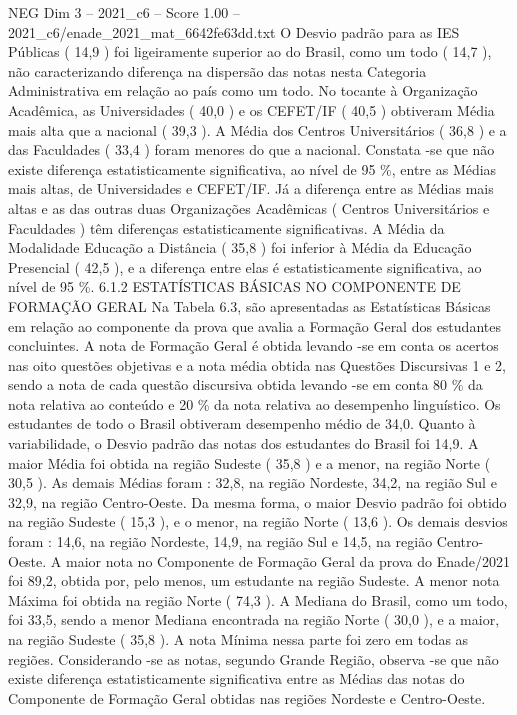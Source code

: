 \begin{textsample}{NEG Dim 3 – 2021\_c6 – Score 1.00 – 2021\_c6/enade\_2021\_mat\_6642fe63dd.txt}
O Desvio padrão para as IES Públicas ( 14,9 ) foi ligeiramente superior ao do Brasil, como um todo ( 14,7 ), não caracterizando diferença na dispersão das notas nesta Categoria Administrativa em relação ao país como um todo.
No tocante à Organização Acadêmica, as Universidades ( 40,0 ) e os CEFET/IF ( 40,5 ) obtiveram Média mais alta que a nacional ( 39,3 ).
A Média dos Centros Universitários ( 36,8 ) e a das Faculdades ( 33,4 ) foram menores do que a nacional.
Constata -se que não existe diferença estatisticamente significativa, ao nível de 95 \%, entre as Médias mais altas, de Universidades e CEFET/IF.
Já a diferença entre as Médias mais altas e as das outras duas Organizações Acadêmicas ( Centros Universitários e Faculdades ) têm diferenças estatisticamente significativas.
A Média da Modalidade Educação a Distância ( 35,8 ) foi inferior à Média da Educação Presencial ( 42,5 ), e a diferença entre elas é estatisticamente significativa, ao nível de 95 \%. 6.1.2 ESTATÍSTICAS BÁSICAS NO COMPONENTE DE FORMAÇÃO GERAL Na Tabela 6.3, são apresentadas as Estatísticas Básicas em relação ao componente da prova que avalia a Formação Geral dos estudantes concluintes.
A nota de Formação Geral é obtida levando -se em conta os acertos nas oito questões objetivas e a nota média obtida nas Questões Discursivas 1 e 2, sendo a nota de cada questão discursiva obtida levando -se em conta 80 \% da nota relativa ao conteúdo e 20 \% da nota relativa ao desempenho linguístico.
Os estudantes de todo o Brasil obtiveram desempenho médio de 34,0.
Quanto à variabilidade, o Desvio padrão das notas dos estudantes do Brasil foi 14,9.
A maior Média foi obtida na região Sudeste ( 35,8 ) e a menor, na região Norte ( 30,5 ).
As demais Médias foram : 32,8, na região Nordeste, 34,2, na região Sul e 32,9, na região Centro-Oeste.
Da mesma forma, o maior Desvio padrão foi obtido na região Sudeste ( 15,3 ), e o menor, na região Norte ( 13,6 ).
Os demais desvios foram : 14,6, na região Nordeste, 14,9, na região Sul e 14,5, na região Centro-Oeste.
A maior nota no Componente de Formação Geral da prova do Enade/2021 foi 89,2, obtida por, pelo menos, um estudante na região Sudeste.
A menor nota Máxima foi obtida na região Norte ( 74,3 ).
A Mediana do Brasil, como um todo, foi 33,5, sendo a menor Mediana encontrada na região Norte ( 30,0 ), e a maior, na região Sudeste ( 35,8 ).
A nota Mínima nessa parte foi zero em todas as regiões.
Considerando -se as notas, segundo Grande Região, observa -se que não existe diferença estatisticamente significativa entre as Médias das notas do Componente de Formação Geral obtidas nas regiões Nordeste e Centro-Oeste.

\end{textsample}
